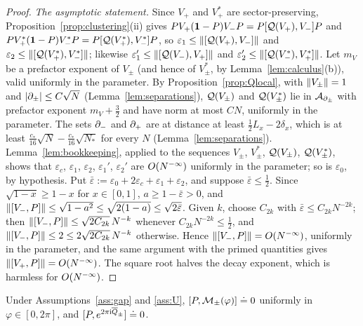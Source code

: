\begin{proof}
\emph{The asymptotic statement.} Since $V_+$ and $V_+^*$ are sector-preserving, Proposition~\ref{prop:clustering}(ii) gives
$PV_+(\mathbf{1}-P)V_-P=P[\mathcal{Q}(V_+),V_-]P$ and $PV_+^*(\mathbf{1}-P)V_-^*P=P[\mathcal{Q}(V_+^*),V_-^*]P$, so $\varepsilon_1\le\lVert[\mathcal{Q}(V_+),V_-]\rVert$ and
$\varepsilon_2\le\lVert[\mathcal{Q}(V_+^*),V_-^*]\rVert$; likewise $\varepsilon_1'\le\lVert[\mathcal{Q}(V_-),V_+]\rVert$ and $\varepsilon_2'\le\lVert[\mathcal{Q}(V_-^*),V_+^*]\rVert$. Let $m_V$ be a
prefactor exponent of $V_\pm$ (and hence of $V_\pm^*$, by Lemma~\ref{lem:calculus}(b)), valid uniformly in the parameter.
By Proposition~\ref{prop:Qlocal}, with $\lVert V_\pm\rVert=1$ and $\lvert\partial_\pm\rvert\le C\sqrt N$ (Lemma~\ref{lem:separations}),
$\mathcal{Q}(V_\pm)$ and $\mathcal{Q}(V_\pm^*)$ lie in $\mathcal{A}_{\partial_\pm}$ with prefactor exponent $m_V+\frac32$ and have norm at most $CN$,
uniformly in the parameter. The sets $\partial_{-}$ and $\partial_{+}$ are at distance at least $\frac12L_x-2\delta_x$, which is at
least $\frac{c_*}{16}\sqrt N-\frac{c_*}{16}\sqrt{N_*}$ for every $N$ (Lemma~\ref{lem:separations}). Lemma~\ref{lem:bookkeeping},
applied to the sequences $V_\pm$, $V_\pm^*$, $\mathcal{Q}(V_\pm)$, $\mathcal{Q}(V_\pm^*)$, shows that $\varepsilon_c$, $\varepsilon_1$, $\varepsilon_2$, $\varepsilon_1'$, $\varepsilon_2'$
are $O(N^{-\infty})$ uniformly in the parameter; so is $\varepsilon_0$, by hypothesis. Put $\bar\varepsilon:=\varepsilon_0+2\varepsilon_c+\varepsilon_1+\varepsilon_2$, and
suppose $\bar\varepsilon\le\frac12$. Since $\sqrt{1-x}\ge1-x$ for $x\in[0,1]$, $a\ge1-\bar\varepsilon>0$, and
$\lVert[V_-,P]\rVert\le\sqrt{1-a^2}\le\sqrt{2(1-a)}\le\sqrt{2\bar\varepsilon}$. Given $k$, choose $C_{2k}$ with $\bar\varepsilon\le C_{2k}N^{-2k}$; then
$\lVert[V_-,P]\rVert\le\sqrt{2C_{2k}}\,N^{-k}$ whenever $C_{2k}N^{-2k}\le\frac12$, and $\lVert[V_-,P]\rVert\le2\le2\sqrt{2C_{2k}}\,N^{-k}$
otherwise. Hence $\lVert[V_-,P]\rVert=O(N^{-\infty})$, uniformly in the parameter, and the same argument with the primed quantities
gives $\lVert[V_+,P]\rVert=O(N^{-\infty})$. The square root halves the decay exponent, which is harmless for $O(N^{-\infty})$.
\end{proof}

\begin{corollary}\label{cor:Zcommute}
Under Assumptions~\ref{ass:gap} and \ref{ass:U}, $[P,\mathcal M_\pm(\varphi)]\doteq0$ uniformly in $\varphi\in[0,2\pi]$, and
$[P,e^{2\pi\mathrm{i}\overline{Q}_\pm}]\doteq0$.
\end{corollary}

